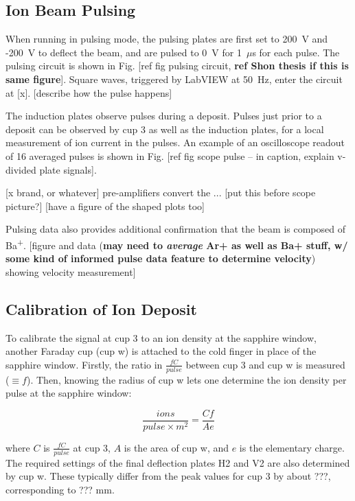 \subsection{Ion Beam Pulsing}

When running in pulsing mode, the pulsing plates are first set to 200~V and -200~V to deflect the beam, and are pulsed to 0~V for 1~$\mu$s for each pulse.  The pulsing circuit is shown in Fig. [ref fig pulsing circuit, \textbf{ref Shon thesis if this is same figure}].  Square waves, triggered by LabVIEW at {\color{red}50~Hz}, enter the circuit at [x]. {\color{red}[describe how the pulse happens]}

The induction plates observe pulses during a deposit.  Pulses just prior to a deposit can be observed by cup 3 as well as the induction plates, for a local measurement of ion current in the pulses.  An example of an oscilloscope readout of {\color{red}16} averaged pulses is shown in Fig. [ref fig scope pulse -- in caption, explain v-divided plate signals].  

[x brand, or whatever] pre-amplifiers convert the ... [put this before scope picture?] [have a figure of the shaped plots too]

Pulsing data also provides additional confirmation that the beam is composed of Ba\textsuperscript{+}.  {\color{gray}[figure and data (\textbf{may need to \emph{average} Ar+ as well as Ba+ stuff, w/ some kind of informed pulse data feature to determine velocity}) showing velocity measurement]}

\subsection{Calibration of Ion Deposit}
\label{subsec:ionDepCal}

To calibrate the signal at cup 3 to an ion density at the sapphire window, another Faraday cup (cup w) is attached to the cold finger in place of the sapphire window.  Firstly, the ratio in $\frac{fC}{pulse}$ between cup 3 and cup w is measured ($\equiv f$).  Then, knowing the radius of cup w lets one determine the ion density per pulse at the sapphire window:

\begin{equation}
\frac{ions}{pulse \times m^{2}} = \frac{C f}{A e}
\label{eqn:ion_density}
\end{equation}

\noindent
where $C$ is $\frac{fC}{pulse}$ at cup 3, $A$ is the area of cup w, and $e$ is the elementary charge.  The required settings of the final deflection plates H2 and V2 are also determined by cup w.  These typically differ from the peak values for cup 3 by about ???, corresponding to ??? mm.

